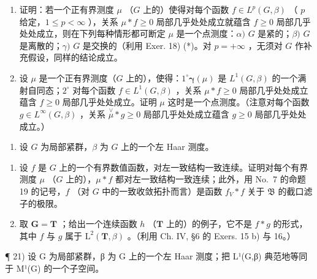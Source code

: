 \begin{enumerate}
\def\labelenumi{\alph{enumi})}
\item
  证明：若一个正有界测度 \(\mu\) （\(G\) 上的）使得对每个函数 \(f \in L^{p}(G, \beta)\) （ \(p\) 给定，\(1 \leqslant p < \infty\) ），关系 \(\mu * f \geqslant 0\) 局部几乎处处成立就蕴含 \(f \geqslant 0\) 局部几乎处处成立，则在下列每种情形都可断定 \(\mu\) 是一个点测度：\(\alpha)\) \(G\) 是紧的；\(\beta)\) \(G\) 是离散的；\(\gamma)\) \(G\) 是交换的（利用 Exer. 18) (*)。对 \(p = +\infty\) ，无须对 \(G\) 作补充假设，同样的结论成立。
\item
  设 \(\mu\) 是一个正有界测度（\(G\) 上的），使得：\(1^{\circ} \pmb{\gamma}(\mu)\) 是 \(L^{1}(G, \beta)\) 的一个满射自同态；\(2^{\circ}\) 对每个函数 \(f \in L^{1}(G, \beta)\) ，关系 \(\mu * f \geqslant 0\) 局部几乎处处成立蕴含 \(f \geqslant 0\) 局部几乎处处成立。证明 \(\mu\) 这时是一个点测度。（注意对每个函数 \(g \in L^{\infty}(G, \beta)\) ，关系 \(\stackrel{\vee}{\mu} * g \geqslant 0\) 局部几乎处处成立蕴含 \(g \geqslant 0\) 局部几乎处处成立。）
\end{enumerate}

\begin{enumerate}
\def\labelenumi{\arabic{enumi})}
\setcounter{enumi}{19}
\tightlist
\item
  设 \(G\) 为局部紧群，\(\beta\) 为 \(G\) 上的一个左 Haar 测度。
\end{enumerate}

\begin{enumerate}
\def\labelenumi{\alph{enumi})}
\item
  设 \(f\) 是 \(G\) 上的一个有界数值函数，对左一致结构一致连续。证明对每个有界测度 \(\mu\) （\(G\) 上的），\(\mu * f\) 都对左一致结构一致连续；此外，用 No.~7 的命题 19 的记号，\(f\) （对 \(G\) 中的一致收敛拓扑而言）是函数 \(f_V * f\) 关于 \(\mathfrak{B}\) 的截口滤子的极限。
\item
  取 \(\mathbf{G} = \mathbf{T}\) ；给出一个连续函数 \(h\) （\(\mathbf{T}\) 上的）的例子，它不是 \(f*g\) 的形式，其中 \(f\) 与 \(g\) 属于 \(\mathrm{L}^2 (\mathbf{T},\beta)\) 。（利用 Ch. IV, §6 的 Exers. 15 b) 与 16。）
\end{enumerate}

¶ 21) 设 G 为局部紧群，β 为 G 上的一个左 Haar 测度；把 L¹(G,β) 典范地等同于 M¹(G) 的一个子空间。


